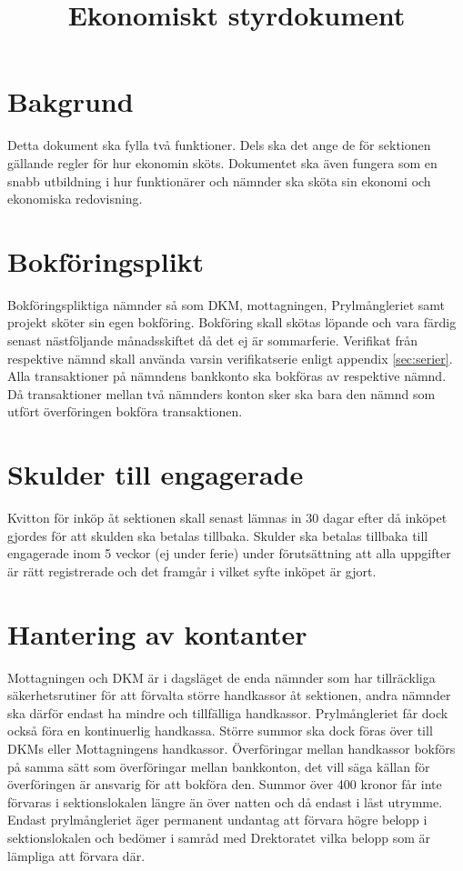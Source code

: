 \documentclass{dgovdoc}
\title{Ekonomiskt styrdokument}
\begin{document}
\maketitle

\section{Bakgrund}

Detta dokument ska fylla två funktioner. Dels ska det ange de för sektionen gällande regler för hur ekonomin
sköts. Dokumentet ska även fungera som en snabb utbildning i hur funktionärer och nämnder ska sköta sin
ekonomi och ekonomiska redovisning.

\section{Bokföringsplikt}

Bokföringspliktiga nämnder så som DKM, mottagningen, Prylmångleriet samt projekt sköter sin egen
bokföring. Bokföring skall skötas löpande och vara färdig senast nästföljande månadsskiftet då det ej är
sommarferie. Verifikat från respektive nämnd skall använda varsin verifikatserie enligt appendix \ref{sec:serier}. Alla
transaktioner på nämndens bankkonto ska bokföras av respektive nämnd. Då transaktioner mellan två
nämnders konton sker ska bara den nämnd som utfört överföringen bokföra transaktionen.

\section{Skulder till engagerade}

Kvitton för inköp åt sektionen skall senast lämnas in 30 dagar efter då inköpet gjordes för att skulden ska
betalas tillbaka. Skulder ska betalas tillbaka till engagerade inom 5 veckor (ej under ferie) under
förutsättning att alla uppgifter är rätt registrerade och det framgår i vilket syfte inköpet är gjort.

\section{Hantering av kontanter}
\label{sec:kontanter}
Mottagningen och DKM är i dagsläget de enda nämnder som har tillräckliga säkerhetsrutiner för att förvalta
större handkassor åt sektionen, andra nämnder ska därför endast ha mindre och tillfälliga handkassor.
Prylmångleriet får dock också föra en kontinuerlig handkassa. Större summor ska dock föras över till DKMs
eller Mottagningens handkassor. Överföringar mellan handkassor bokförs på samma sätt som överföringar
mellan bankkonton, det vill säga källan för överföringen är ansvarig för att bokföra den. Summor över 400
kronor får inte förvaras i sektionslokalen längre än över natten och då endast i låst utrymme. Endast
prylmångleriet äger permanent undantag att förvara högre belopp i sektionslokalen och bedömer i samråd
med D­rektoratet vilka belopp som är lämpliga att förvara där.
\end{document}
